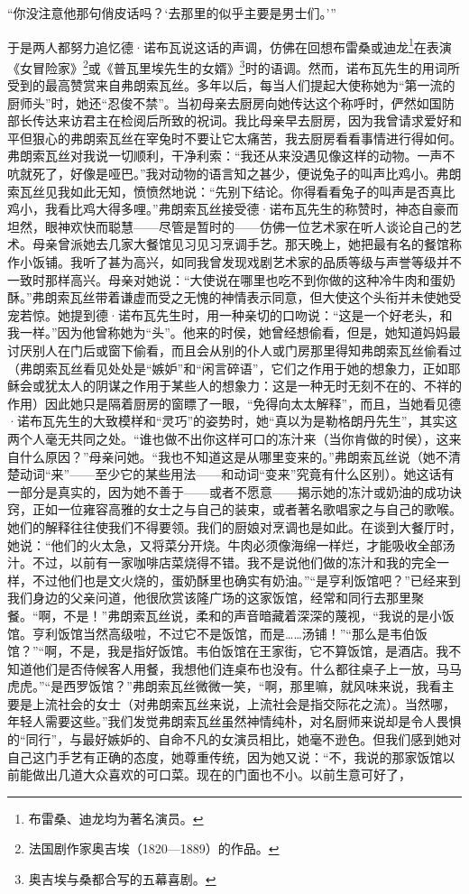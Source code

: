 \par “你没注意他那句俏皮话吗？‘去那里的似乎主要是男士们。’”
\par 于是两人都努力追忆德·诺布瓦说这话的声调，仿佛在回想布雷桑或迪龙\footnote{布雷桑、迪龙均为著名演员。}在表演《女冒险家》\footnote{法国剧作家奥吉埃（1820—1889）的作品。}或《普瓦里埃先生的女婿》\footnote{奥吉埃与桑都合写的五幕喜剧。}时的语调。然而，诺布瓦先生的用词所受到的最高赞赏来自弗朗索瓦丝。多年以后，每当人们提起大使称她为“第一流的厨师头”时，她还“忍俊不禁”。当初母亲去厨房向她传达这个称呼时，俨然如国防部长传达来访君主在检阅后所致的祝词。我比母亲早去厨房，因为我曾请求爱好和平但狠心的弗朗索瓦丝在宰兔时不要让它太痛苦，我去厨房看看事情进行得如何。弗朗索瓦丝对我说一切顺利，干净利索：“我还从来没遇见像这样的动物。一声不吭就死了，好像是哑巴。”我对动物的语言知之甚少，便说兔子的叫声比鸡小。弗朗索瓦丝见我如此无知，愤愤然地说：“先别下结论。你得看看兔子的叫声是否真比鸡小，我看比鸡大得多哩。”弗朗索瓦丝接受德·诺布瓦先生的称赞时，神态自豪而坦然，眼神欢快而聪慧——尽管是暂时的——仿佛一位艺术家在听人谈论自己的艺术。母亲曾派她去几家大餐馆见习见习烹调手艺。那天晚上，她把最有名的餐馆称作小饭铺。我听了甚为高兴，如同我曾发现戏剧艺术家的品质等级与声誉等级并不一致时那样高兴。母亲对她说：“大使说在哪里也吃不到你做的这种冷牛肉和蛋奶酥。”弗朗索瓦丝带着谦虚而受之无愧的神情表示同意，但大使这个头衔并未使她受宠若惊。她提到德·诺布瓦先生时，用一种亲切的口吻说：“这是一个好老头，和我一样。”因为他曾称她为“头”。他来的时侯，她曾经想偷看，但是，她知道妈妈最讨厌别人在门后或窗下偷看，而且会从别的仆人或门房那里得知弗朗索瓦丝偷看过（弗朗索瓦丝看见处处是“嫉妒”和“闲言碎语”，它们之作用于她的想象力，正如耶稣会或犹太人的阴谋之作用于某些人的想象力：这是一种无时无刻不在的、不祥的作用）因此她只是隔着厨房的窗瞟了一眼，“免得向太太解释”，而且，当她看见德·诺布瓦先生的大致模样和“灵巧”的姿势时，她“真以为是勒格朗丹先生”，其实这两个人毫无共同之处。“谁也做不出你这样可口的冻汁来（当你肯做的时侯），这来自什么原因？”母亲问她。“我也不知道这是从哪里变来的。”弗朗索瓦丝说（她不清楚动词“来”——至少它的某些用法——和动词“变来”究竟有什么区别）。她这话有一部分是真实的，因为她不善于——或者不愿意——揭示她的冻汁或奶油的成功诀窍，正如一位雍容高雅的女士之与自己的装束，或者著名歌唱家之与自己的歌喉。她们的解释往往使我们不得要领。我们的厨娘对烹调也是如此。在谈到大餐厅时，她说：“他们的火太急，又将菜分开烧。牛肉必须像海绵一样烂，才能吸收全部汤汁。不过，以前有一家咖啡店菜烧得不错。我不是说他们做的冻汁和我的完全一样，不过他们也是文火烧的，蛋奶酥里也确实有奶油。”“是亨利饭馆吧？”已经来到我们身边的父亲问道，他很欣赏该隆广场的这家饭馆，经常和同行去那里聚餐。“啊，不是！”弗朗索瓦丝说，柔和的声音暗藏着深深的蔑视，“我说的是小饭馆。亨利饭馆当然高级啦，不过它不是饭馆，而是……汤铺！”“那么是韦伯饭馆？”“啊，不是，我是指好饭馆。韦伯饭馆在王家街，它不算饭馆，是酒店。我不知道他们是否侍候客人用餐，我想他们连桌布也没有。什么都往桌子上一放，马马虎虎。”“是西罗饭馆？”弗朗索瓦丝微微一笑，“啊，那里嘛，就风味来说，我看主要是上流社会的女士（对弗朗索瓦丝来说，上流社会是指交际花之流）。当然哪，年轻人需要这些。”我们发觉弗朗索瓦丝虽然神情纯朴，对名厨师来说却是令人畏惧的“同行”，与最好嫉妒的、自命不凡的女演员相比，她毫不逊色。但我们感到她对自己这门手艺有正确的态度，她尊重传统，因为她又说：“不，我说的那家饭馆以前能做出几道大众喜欢的可口菜。现在的门面也不小。以前生意可好了，